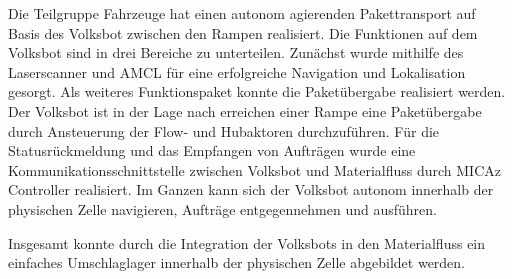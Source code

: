 Die Teilgruppe Fahrzeuge hat einen autonom agierenden Pakettransport auf Basis des Volksbot zwischen den Rampen realisiert. Die Funktionen auf dem Volksbot sind in drei Bereiche zu unterteilen. Zunächst wurde mithilfe des Laserscanner und AMCL für eine erfolgreiche Navigation und Lokalisation gesorgt. Als weiteres Funktionspaket konnte die Paketübergabe realisiert werden. Der Volksbot ist in der Lage nach erreichen einer Rampe eine Paketübergabe durch Ansteuerung der Flow- und Hubaktoren durchzuführen. Für die Statusrückmeldung und das Empfangen von Aufträgen wurde eine Kommunikationsschnittstelle zwischen Volksbot und Materialfluss durch MICAz Controller realisiert. Im Ganzen kann sich der Volksbot autonom innerhalb der physischen Zelle navigieren, Aufträge entgegennehmen und ausführen.

Insgesamt konnte durch die Integration der Volksbots in den Materialfluss ein einfaches Umschlaglager innerhalb der physischen Zelle abgebildet werden. 



